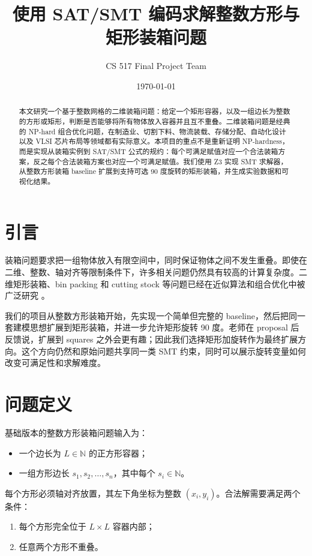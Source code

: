 \documentclass[UTF8,11pt]{ctexart}
\title{使用 SAT/SMT 编码求解整数方形与矩形装箱问题}
\author{CS 517 Final Project Team}
\date{\today}
\begin{document}
\maketitle

\begin{abstract}
本文研究一个基于整数网格的二维装箱问题：给定一个矩形容器，以及一组边长为整数的方形或矩形，判断是否能够将所有物体放入容器并且互不重叠。二维装箱问题是经典的 NP-hard 组合优化问题，在制造业、切割下料、物流装载、存储分配、自动化设计以及 VLSI 芯片布局等领域都有实际意义。本项目的重点不是重新证明 NP-hardness，而是实现从装箱实例到 SAT/SMT 公式的规约：每个可满足赋值对应一个合法装箱方案，反之每个合法装箱方案也对应一个可满足赋值。我们使用 Z3 实现 SMT 求解器，从整数方形装箱 baseline 扩展到支持可选 90 度旋转的矩形装箱，并生成实验数据和可视化结果。
\end{abstract}

\section{引言}

装箱问题要求把一组物体放入有限空间中，同时保证物体之间不发生重叠。即使在二维、整数、轴对齐等限制条件下，许多相关问题仍然具有较高的计算复杂度。二维矩形装箱、bin packing 和 cutting stock 等问题已经在近似算法和组合优化中被广泛研究 \cite{garey1979computers,coffman1980performance}。

我们的项目从整数方形装箱开始，先实现一个简单但完整的 baseline，然后把同一套建模思想扩展到矩形装箱，并进一步允许矩形旋转 90 度。老师在 proposal 后反馈说，扩展到 squares 之外会更有趣；因此我们选择矩形加旋转作为最终扩展方向。这个方向仍然和原始问题共享同一类 SMT 约束，同时可以展示旋转变量如何改变可满足性和求解难度。

\section{问题定义}

基础版本的整数方形装箱问题输入为：
\begin{itemize}
    \item 一个边长为 \(L \in \mathbb{N}\) 的正方形容器；
    \item 一组方形边长 \(s_1,s_2,\ldots,s_n\)，其中每个 \(s_i \in \mathbb{N}\)。
\end{itemize}

每个方形必须轴对齐放置，其左下角坐标为整数 \((x_i,y_i)\)。合法解需要满足两个条件：
\begin{enumerate}
    \item 每个方形完全位于 \(L\times L\) 容器内部；
    \item 任意两个方形不重叠。
\end{enumerate}
\end{document}
